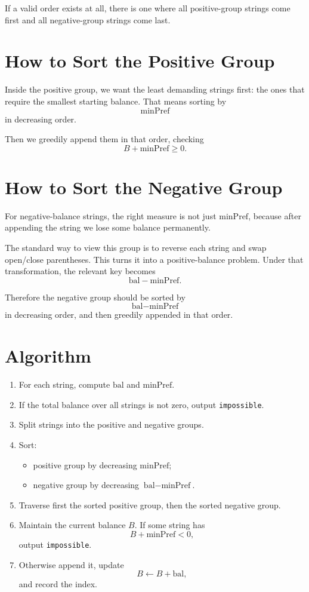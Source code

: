 \documentclass[11pt]{article}
\begin{document}
If a valid order exists at all, there is one where all positive-group strings come first and all
negative-group strings come last.

\section*{How to Sort the Positive Group}

Inside the positive group, we want the least demanding strings first: the ones that require the smallest
starting balance. That means sorting by
\[
    \text{minPref}
\]
in decreasing order.

Then we greedily append them in that order, checking
\[
    B + \text{minPref} \ge 0.
\]

\section*{How to Sort the Negative Group}

For negative-balance strings, the right measure is not just $\text{minPref}$, because after appending the
string we lose some balance permanently.

The standard way to view this group is to reverse each string and swap open/close parentheses. This turns
it into a positive-balance problem. Under that transformation, the relevant key becomes
\[
    \text{bal} - \text{minPref}.
\]

Therefore the negative group should be sorted by
\[
    \text{bal} - \text{minPref}
\]
in decreasing order, and then greedily appended in that order.

\section*{Algorithm}

\begin{enumerate}[leftmargin=*]
    \item For each string, compute $\text{bal}$ and $\text{minPref}$.
    \item If the total balance over all strings is not zero, output \texttt{impossible}.
    \item Split strings into the positive and negative groups.
    \item Sort:
    \begin{itemize}[leftmargin=*]
        \item positive group by decreasing $\text{minPref}$;
        \item negative group by decreasing $\text{bal} - \text{minPref}$.
    \end{itemize}
    \item Traverse first the sorted positive group, then the sorted negative group.
    \item Maintain the current balance $B$. If some string has
    \[
        B + \text{minPref} < 0,
    \]
    output \texttt{impossible}.
    \item Otherwise append it, update
    \[
        B \leftarrow B + \text{bal},
    \]
    and record the index.
\end{enumerate}
\end{document}
